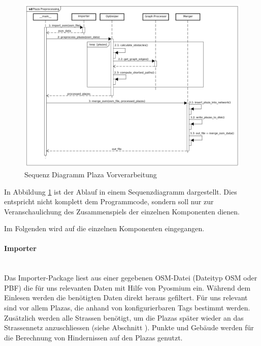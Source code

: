 \begin{figure}[ht]
    \centering
    \includegraphics[width=1\linewidth]{projectdoc/img/sequence_diagram_plaza_preprocessing.png}
    \caption[Sequenz Diagramm Plaza Vorverarbeitung]{Sequenz Diagramm Plaza Vorverarbeitung}
    \label{fig:sequence_diagram_plaza_preprocessing}
\end{figure}

In Abbildung \ref{fig:sequence_diagram_plaza_preprocessing} ist der Ablauf in einem Sequenzdiagramm dargestellt. Dies entspricht nicht komplett dem Programmcode, sondern soll nur zur Veranschaulichung des Zusammenspiels der einzelnen Komponenten dienen.

Im Folgenden wird auf die einzelnen Komponenten eingegangen.

\paragraph{Importer}\label{impl:Importer}~\\
Das Importer-Package liest aus einer gegebenen \ac{OSM}-Datei (Dateityp \ac{OSM} oder \ac{PBF}) die für uns relevanten Daten mit Hilfe von Pyosmium \cite{pyosmium} ein. Während dem Einlesen werden die benötigten Daten direkt heraus gefiltert. Für uns relevant sind vor allem Plazas, die anhand von konfigurierbaren Tags bestimmt werden. Zusätzlich werden alle Strassen benötigt, um die Plazas später wieder an das Strassennetz anzuschliessen (siehe Abschnitt ). Punkte und Gebäude werden für die Berechnung von Hindernissen auf den Plazas genutzt.

